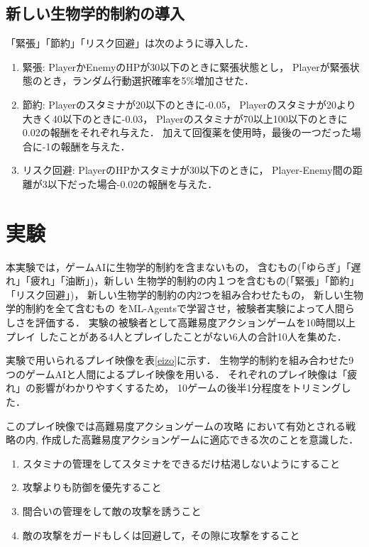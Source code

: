 \documentclass[a4paper,12pt,oneside,openany,titlepage]{jreport}
\begin{document}
\section{新しい生物学的制約の導入}
 「緊張」「節約」「リスク回避」は次のように導入した．
 \begin{enumerate}
   \item 緊張: PlayerかEnemyのHPが30以下のときに緊張状態とし，
   Playerが緊張状態のとき，ランダム行動選択確率を5$\%$増加させた．
         
   \item 節約: Playerのスタミナが20以下のときに-0.05，
   Playerのスタミナが20より大きく40以下のときに-0.03，
   Playerのスタミナが70以上100以下のときに0.02の報酬をそれぞれ与えた．
   加えて回復薬を使用時，最後の一つだった場合に-1の報酬を与えた．        
         
   \item リスク回避: PlayerのHPかスタミナが30以下のときに，
   Player-Enemy間の距離が3以下だった場合-0.02の報酬を与えた．
 
 \end{enumerate}
 


\chapter{実験}
 \thispagestyle{fancy}
 \lhead{\leftmark}
 \rhead{\thepage}
 \renewcommand{\headrulewidth}{1pt}

 本実験では，ゲームAIに生物学的制約を含まないもの，
 含むもの(「ゆらぎ」「遅れ」「疲れ」「油断」)，新しい
 生物学的制約の内１つを含むもの(「緊張」「節約」「リスク回避」)，
 新しい生物学的制約の内2つを組み合わせたもの，
 新しい生物学的制約を全て含むもの
 をML-Agentsで学習させ，被験者実験によって人間らしさを評価する．
 実験の被験者として高難易度アクションゲームを10時間以上プレイ
 したことがある4人とプレイしたことがない6人の合計10人を集めた．
 
 
 実験で用いられるプレイ映像を表\ref{eizo}に示す．
 生物学的制約を組み合わせた9つのゲームAIと人間によるプレイ映像を用いる．
 それぞれのプレイ映像は「疲れ」の影響がわかりやすくするため，
 10ゲームの後半1分程度をトリミングした．
 
 このプレイ映像では高難易度アクションゲームの攻略
 において有効とされる戦略\cite{fam_kouryaku}の内,
 作成した高難易度アクションゲームに適応できる次のことを意識した．
 \begin{enumerate}
   \item スタミナの管理をしてスタミナをできるだけ枯渇しないようにすること
   \item 攻撃よりも防御を優先すること
   \item 間合いの管理をして敵の攻撃を誘うこと
   \item 敵の攻撃をガードもしくは回避して，その隙に攻撃をすること
 \end{enumerate}
 
\end{document}
